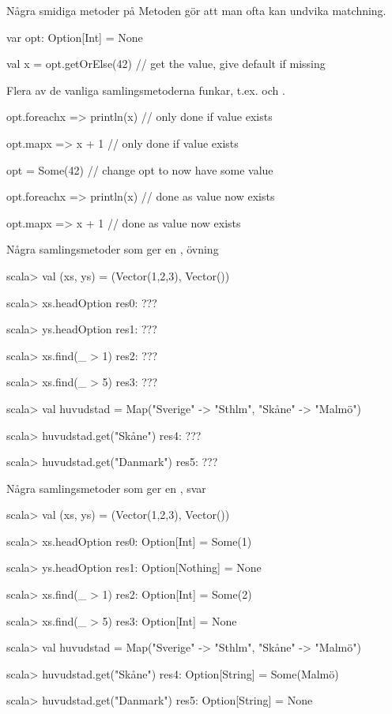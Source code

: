 \begin{Slide}{Några smidiga metoder på }\SlideFontSmall
Metoden  gör att man ofta kan undvika matchning.
\begin{Code}
var opt: Option[Int] = None

val x = opt.getOrElse(42)   // get the value, give default if missing
\end{Code}

Flera av de vanliga samlingsmetoderna funkar, t.ex.  och .
\begin{Code}
opt.foreach{x => println(x)} // only done if value exists

opt.map{x => x + 1}          // only done if value exists

opt = Some(42)               // change opt to now have some value

opt.foreach{x => println(x)} // done as value now exists

opt.map{x => x + 1}          // done as value now exists

\end{Code}
\end{Slide}


\begin{Slide}{Några samlingsmetoder som ger en , övning}
\begin{REPL}
scala> val (xs, ys) = (Vector(1,2,3), Vector())

scala> xs.headOption
res0: ???

scala> ys.headOption
res1: ???

scala> xs.find(_ > 1)
res2: ???

scala> xs.find(_ > 5)
res3: ???

scala> val huvudstad = Map("Sverige" -> "Sthlm", "Skåne" -> "Malmö")

scala> huvudstad.get("Skåne")
res4: ???

scala> huvudstad.get("Danmark")
res5: ???
\end{REPL}
\end{Slide}

\begin{Slide}{Några samlingsmetoder som ger en , svar}
\begin{REPL}
scala> val (xs, ys) = (Vector(1,2,3), Vector())

scala> xs.headOption
res0: Option[Int] = Some(1)

scala> ys.headOption
res1: Option[Nothing] = None

scala> xs.find(_ > 1)
res2: Option[Int] = Some(2)

scala> xs.find(_ > 5)
res3: Option[Int] = None

scala> val huvudstad = Map("Sverige" -> "Sthlm", "Skåne" -> "Malmö")

scala> huvudstad.get("Skåne")
res4: Option[String] = Some(Malmö)

scala> huvudstad.get("Danmark")
res5: Option[String] = None
\end{REPL}
\end{Slide}
